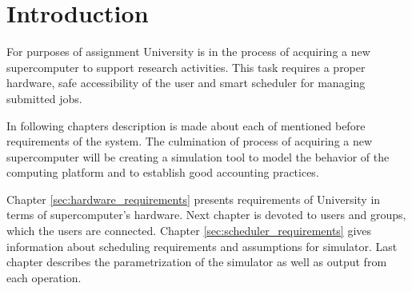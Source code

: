 \chapter{Introduction}
	For purposes of assignment University is in the process of acquiring a new supercomputer to support research activities. This task requires a proper hardware, safe accessibility of the user and smart scheduler for managing submitted jobs.
	
	In following chapters description is made about each of mentioned before requirements of the system. The culmination of process of acquiring a new supercomputer will be creating a simulation tool to model the behavior of the computing platform and to establish good accounting practices. 
	
	Chapter \ref{sec:hardware_requirements} presents requirements of University in terms of supercomputer's hardware. Next chapter is devoted to users and groups, which the users are connected. Chapter \ref{sec:scheduler_requirements} gives information about scheduling requirements and assumptions for simulator. Last chapter describes the parametrization of the simulator as well as output from each operation.